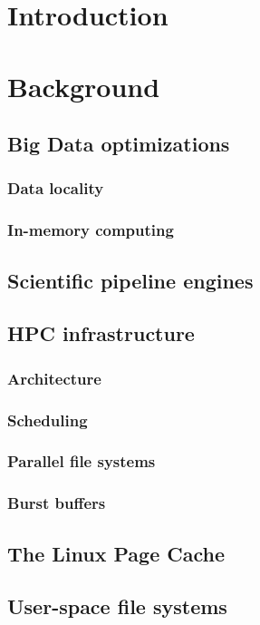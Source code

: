 \documentclass{report}
\begin{document}
    \chapter{Introduction}
    
    \chapter{Background}
        \section{Big Data optimizations}
            \subsection{Data locality}
            \subsection{In-memory computing}
        \section{Scientific pipeline engines}
        \section{HPC infrastructure}
            \subsection{Architecture}
            \subsection{Scheduling}
            \subsection{Parallel file systems}
            \subsection{Burst buffers}
        \section{The Linux Page Cache}
        \section{User-space file systems}
\end{document}
